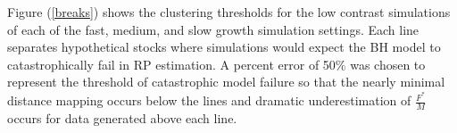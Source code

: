 %
%

Figure (\ref{breaks}) shows the clustering thresholds for the low contrast
simulations of each of the fast, medium, and slow growth simulation settings.
Each line separates hypothetical stocks where simulations would expect the BH model %
to catastrophically fail in RP estimation. %
A percent error of 50\% was chosen to represent the threshold of catastrophic model failure so that the 
nearly minimal distance mapping
occurs below the lines and dramatic underestimation of $\frac{F^*}{M}$ occurs for data generated
above each line.

